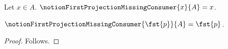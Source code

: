 

\begin{definition}\label{notion_first_projection_missing_consumer}
    Let $x\in A$.
    $\notionFirstProjectionMissingConsumer{x}{A}=x$.
\end{definition}

\begin{proposition}\label{notion_first_projection_missing}
    $\notionFirstProjectionMissingConsumer{\fst{p}}{A}=\fst{p}$.
\end{proposition}
\begin{proof}
    Follows.
\end{proof}
